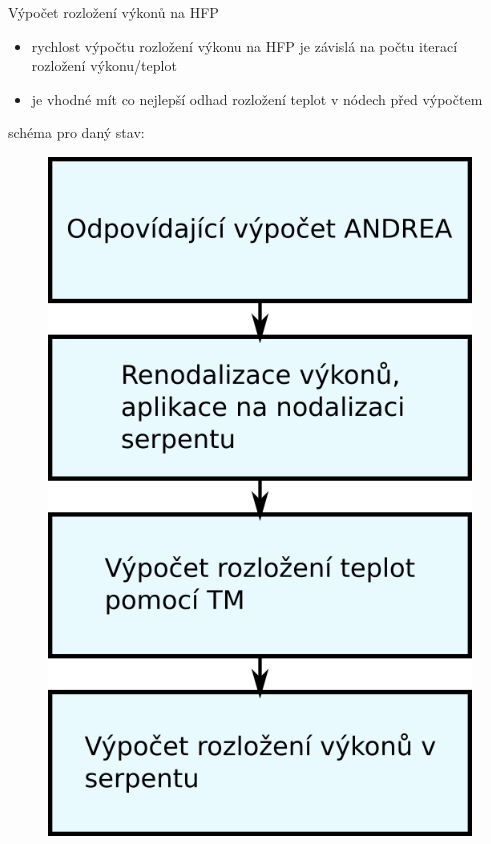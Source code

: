\documentclass{beamer}
\begin{document}
\begin{frame}{Výpočet rozložení výkonů na HFP}
\begin{block}{}
\begin{itemize}\scriptsize
	\item rychlost výpočtu rozložení výkonu na HFP je závislá na počtu iterací rozložení výkonu/teplot 
    \item je vhodné mít co nejlepší odhad rozložení teplot v nódech před výpočtem
\end{itemize}
\end{block}
\small schéma pro daný stav:
\begin{figure}
	\centering
	\includegraphics[scale=0.4]{img/vypocet_teploty.png}
\end{figure}
\end{frame}
\end{document}
